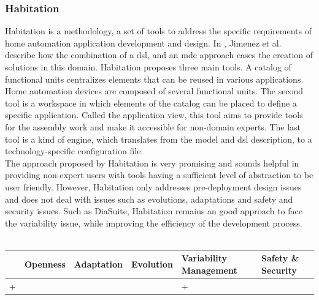 \subsubsection{Habitation}
Habitation is a methodology, a set of tools to address the specific requirements of home automation application development and design. In \cite{Jimenez:2009}, Jimenez et al. describe how the combination of a \gls{dsl}, and an \gls{mde} approach eases the creation of solutions in this domain. Habitation proposes three main tools. A catalog of functional units centralizes elements that can be reused in various applications. Home automation devices are composed of several functional units. The second tool is a workspace in which elements of the catalog can be placed to define a specific application. Called the application view, this tool aims to provide tools for the assembly work and make it accessible for non-domain experts. The last tool is a kind of engine, which translates from the model and \gls{dsl} description, to a technology-specific configuration file.\\


The approach proposed by Habitation is very promising and sounds helpful in providing non-expert users with tools having a sufficient level of abstraction to be user friendly. However, Habitation only addresses pre-deployment design issues and does not deal with issues such as evolutions, adaptations and safety and security issues. Such as DiaSuite, Habitation remains an good approach to face the variability issue, while improving the efficiency of the development process.\\
\\
\begin{tabular}{ >{\centering}m{}| >{\centering}m{} >{\centering}m{}| >{\centering}m{} >{\centering}m{}| >{\centering\arraybackslash}m{}}
{\tiny Interoperability} & {\tiny Openness} & {\tiny Adaptation} & {\tiny Evolution} & {\tiny Variability Management} & {\tiny Safety \& Security}\\
 \hline
 + &  &  &  & + & \\ 
  \hline
\end{tabular}\\


